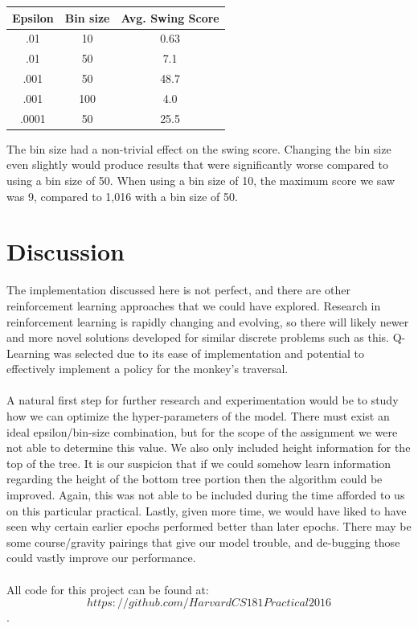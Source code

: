 \documentclass{article}
\begin{document}
\begin{center}
\begin{tabular}{ |c|c|c| } 
\hline
 {Epsilon} &  {Bin size}  &  {Avg. Swing Score} \\ 
 \hline
  .01 & 10 & 0.63 \\
  .01 & 50 & 7.1\\  
 .001 & 50 & 48.7 \\
 .001 & 100 & 4.0 \\
 .0001 & 50 & 25.5 \\  

\hline
\end{tabular}
\end{center}

The bin size had a non-trivial effect on the swing score.  Changing the bin size even slightly would produce results that were significantly worse compared to using a bin size of 50.  When using a bin size of 10, the maximum score we saw was 9, compared to 1,016 with a bin size of 50.  

\section{Discussion}
The implementation discussed here is not perfect, and there are other reinforcement learning approaches that we could have explored. Research in reinforcement learning is rapidly changing and evolving, so there will likely newer and more novel solutions developed for similar discrete problems such as this. Q-Learning was selected due to its ease of implementation and potential to effectively implement a policy for the monkey's traversal.\\\\
A natural first step for further research and experimentation would be to study how we can optimize the hyper-parameters of the model. There must exist an ideal epsilon/bin-size combination, but for the scope of the assignment we were not able to determine this value. We also only included height information for the top of the tree. It is our suspicion that if we could somehow learn information regarding the height of the bottom tree portion then the algorithm could be improved. Again, this was not able to be included during the time afforded to us on this particular practical. Lastly, given more time, we would have liked to have seen why certain earlier epochs performed better than later epochs. There may be some course/gravity pairings that give our model trouble, and de-bugging those could vastly improve our performance. \\\\
All code for this project can be found at: $$https://github.com/HarvardCS181Practical2016$$.
\end{document}
